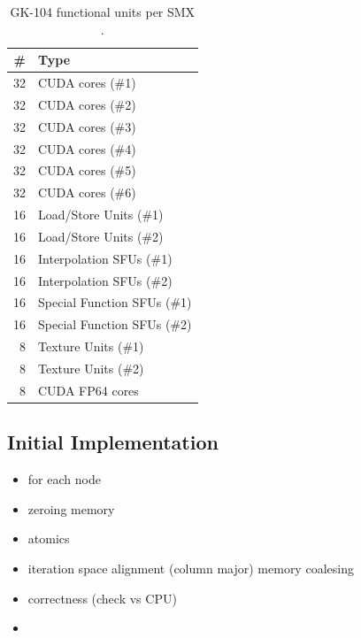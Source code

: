 \documentclass[11pt, oneside, a4paper]{article}
\begin{document}
\begin{table}[tb]
	\caption{GK-104 functional units per SMX \cite{Anand}.}
	\label{tab:funcunits}
	\begin{center}
		\begin{tabular}{rl}
		\hline

		\hline
		\textbf{\#} & \textbf{Type} \\
		\hline
			32 & CUDA cores (\#1) \\
			32 & CUDA cores (\#2) \\
			32 & CUDA cores (\#3) \\
			32 & CUDA cores (\#4) \\
			32 & CUDA cores (\#5) \\
			32 & CUDA cores (\#6) \\
			16 & Load/Store Units (\#1) \\
			16 & Load/Store Units (\#2) \\
			16 & Interpolation SFUs (\#1) \\
			16 & Interpolation SFUs (\#2) \\
			16 & Special Function SFUs (\#1) \\
			16 & Special Function SFUs (\#2) \\
			8 & Texture Units (\#1) \\
			8 & Texture Units (\#2) \\
			8 & CUDA FP64 cores \\
		\hline

		\hline
		\end{tabular}
	\end{center}
\end{table}


\subsection{Initial Implementation} %
\label{sub:initial_implementation}

\begin{itemize}
	\item for each node
	\item zeroing memory
	\item atomics
	\item iteration space alignment (column major) memory coalesing
	\item correctness (check vs CPU)
	\item 
\end{itemize}
\end{document}
